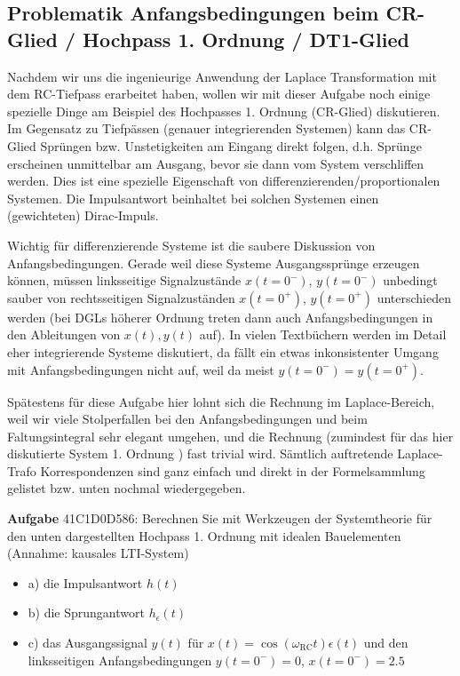 \subsection{Problematik Anfangsbedingungen beim CR-Glied / Hochpass 1. Ordnung / DT1-Glied}
\label{sec:41C1D0D586}
\begin{Ziel}
Nachdem wir uns die ingenieurige Anwendung der Laplace Transformation mit dem
RC-Tiefpass erarbeitet haben, wollen wir mit dieser Aufgabe noch einige
spezielle Dinge am Beispiel des Hochpasses 1. Ordnung (CR-Glied)
diskutieren.
%
Im Gegensatz zu Tiefpässen (genauer integrierenden Systemen) kann das CR-Glied
Sprüngen bzw. Unstetigkeiten am Eingang direkt folgen,
d.h. Sprünge erscheinen unmittelbar am Ausgang, bevor sie dann vom
System verschliffen werden.
%
Dies ist eine spezielle Eigenschaft von differenzierenden/proportionalen Systemen.
%
Die Impulsantwort beinhaltet bei solchen Systemen einen (gewichteten) Dirac-Impuls.

Wichtig für differenzierende Systeme ist die saubere Diskussion von Anfangsbedingungen.
Gerade weil diese Systeme Ausgangssprünge erzeugen können, müssen
linksseitige Signalzustände $x(t=0^-)$, $y(t=0^-)$ unbedingt sauber von rechtsseitigen
Signalzuständen $x(t=0^+)$, $y(t=0^+)$ unterschieden werden (bei DGLs höherer Ordnung
treten dann auch Anfangsbedingungen in den Ableitungen von $x(t), y(t)$ auf).
In vielen Textbüchern werden im Detail eher integrierende Systeme diskutiert, da fällt
ein etwas inkonsistenter Umgang mit Anfangsbedingungen nicht auf, weil da meist
$y(t=0^-) = y(t=0^+)$.
%

Spätestens für diese Aufgabe hier lohnt sich die Rechnung im Laplace-Bereich,
weil wir viele Stolperfallen
bei den Anfangsbedingungen und beim Faltungsintegral sehr elegant umgehen, und die
Rechnung (zumindest für das hier diskutierte System 1. Ordnung ) fast trivial wird.
Sämtlich auftretende Laplace-Trafo Korrespondenzen sind ganz einfach und direkt
in der Formelsammlung gelistet bzw. unten nochmal wiedergegeben.
\end{Ziel}
\textbf{Aufgabe} {\tiny 41C1D0D586}: Berechnen Sie mit Werkzeugen der Systemtheorie
für den unten dargestellten Hochpass 1. Ordnung
mit idealen Bauelementen (Annahme: kausales LTI-System)
\begin{itemize}
  \item a) die Impulsantwort $h(t)$
  \item b) die Sprungantwort $h_\epsilon(t)$
  \item c) das Ausgangssignal $y(t)$ für $x(t) = \cos(\omega_\mathrm{RC} t) \epsilon(t)$ und den linksseitigen Anfangsbedingungen $y(t=0^-) = 0$, $x(t=0^-) = 2.5$
\end{itemize}
